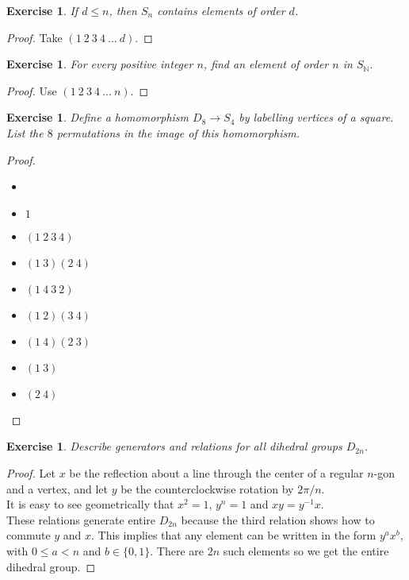\documentclass[a4paper, 11pt]{book}
\theoremstyle{plain}
\newtheorem{exercise}[theorem]{Exercise}
\theoremstyle{plain}
\begin{document}
\begin{exercise}
If $d\leq n$, then $S_n$ contains elements of order $d$.
\end{exercise}
\begin{proof}
Take $(1~2~3~4~...~d)$.
\end{proof}

\begin{exercise}
For every positive integer $n$, find an element of order $n$ in $S_\mathbb{N}$.
\end{exercise}
\begin{proof}
Use $(1~2~3~4~...~n)$.
\end{proof}

\begin{exercise}
Define a homomorphism $D_8\rightarrow S_4$ by labelling vertices of a square. List the $8$ permutations in the image of this homomorphism.
\end{exercise}
\begin{proof}
\begin{itemize}
    \item[]
    \item $1$
    \item $(1~2~3~4)$
    \item $(1~3)(2~4)$
    \item $(1~4~3~2)$
    \item $(1~2)(3~4)$
    \item $(1~4)(2~3)$
    \item $(1~3)$
    \item $(2~4)$
\end{itemize}
\end{proof}

\begin{exercise}
Describe generators and relations for all dihedral groups $D_{2n}$.
\end{exercise}
\begin{proof}
Let $x$ be the reflection about a line through the center of a regular $n$-gon and a vertex, and let $y$ be the counterclockwise rotation by $2\pi/n$.\\
It is easy to see geometrically that $x^2 = 1$, $y^n=1$ and $xy = y^{-1}x$.\\
These relations generate entire $D_{2n}$ because the third relation shows how to commute $y$ and $x$. This implies that any element can be written in the form $y^a x^b$, with $0\leq a<n$ and $b\in \{0,1\}$. There are $2n$ such elements so we get the entire dihedral group.
\end{proof}
\end{document}
